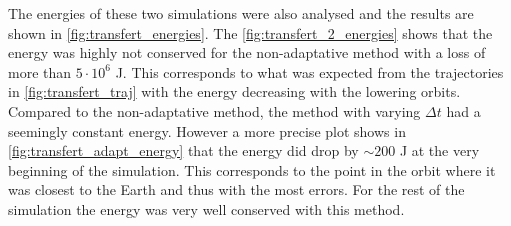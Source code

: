 The energies of these two simulations were also analysed and the results are shown in \autoref{fig:transfert_energies}. The \autoref{fig:transfert_2_energies} shows that the energy was highly not conserved for the non-adaptative method with a loss of more than $5\cdot10^6$ \si{\joule}. This corresponds to what was expected from the trajectories in \autoref{fig:transfert_traj} with the energy decreasing with the lowering orbits. Compared to the non-adaptative method, the method with varying $\Delta t$ had a seemingly constant energy. However a more precise plot shows in \autoref{fig:transfert_adapt_energy} that the energy did drop by $\sim 200$ \si{\joule} at the very beginning of the simulation. This corresponds to the point in the orbit where it was closest to the Earth and thus with the most errors. For the rest of the simulation the energy was very well conserved with this method.
